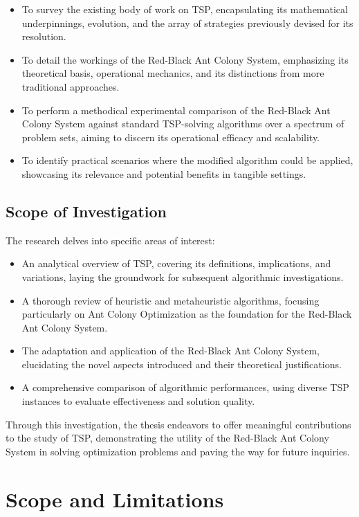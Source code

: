 \begin{itemize}
	\item To survey the existing body of work on TSP, encapsulating its mathematical underpinnings, evolution, and the array of strategies previously devised for its resolution.
	\item To detail the workings of the Red-Black Ant Colony System, emphasizing its theoretical basis, operational mechanics, and its distinctions from more traditional approaches.
	\item To perform a methodical experimental comparison of the Red-Black Ant Colony System against standard TSP-solving algorithms over a spectrum of problem sets, aiming to discern its operational efficacy and scalability.
	\item To identify practical scenarios where the modified algorithm could be applied, showcasing its relevance and potential benefits in tangible settings.
\end{itemize}

\subsection{Scope of Investigation}

The research delves into specific areas of interest:

\begin{itemize}
	\item An analytical overview of TSP, covering its definitions, implications, and variations, laying the groundwork for subsequent algorithmic investigations.
	\item A thorough review of heuristic and metaheuristic algorithms, focusing particularly on Ant Colony Optimization as the foundation for the Red-Black Ant Colony System.
	\item The adaptation and application of the Red-Black Ant Colony System, elucidating the novel aspects introduced and their theoretical justifications.
	\item A comprehensive comparison of algorithmic performances, using diverse TSP instances to evaluate effectiveness and solution quality.
\end{itemize}

Through this investigation, the thesis endeavors to offer meaningful contributions to the study of TSP, demonstrating the utility of the Red-Black Ant Colony System in solving optimization problems and paving the way for future inquiries.

\section{Scope and Limitations}

